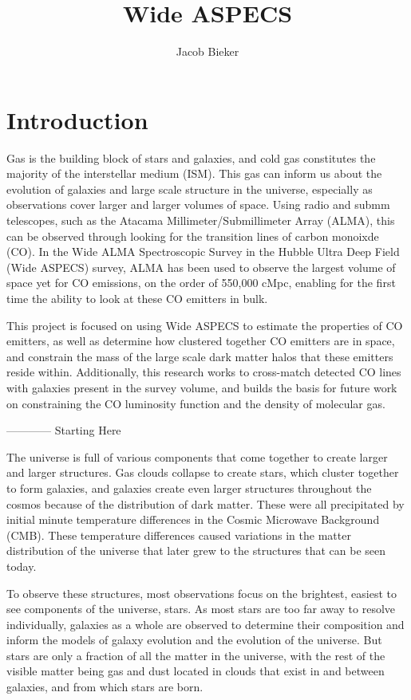 \documentclass[twoside,single]{lion-msc}
\title{Wide ASPECS}
\author{Jacob Bieker}
\affiliation{Leiden Observatory, Leiden University}
\begin{document}
\maketitle

\tableofcontents
\cleardoublepage

\chapter{Introduction}

Gas is the building block of stars and galaxies, and cold gas constitutes the majority of the interstellar medium (ISM). This gas can inform us about the evolution of galaxies and large scale structure in the universe, especially as observations cover larger and larger volumes of space. Using radio and submm telescopes, such as the Atacama Millimeter/Submillimeter Array (ALMA), this can be observed through looking for the transition lines of carbon monoixde (CO). In the Wide ALMA Spectroscopic Survey in the Hubble Ultra Deep Field (Wide ASPECS) survey, ALMA has been used to observe the largest volume of space yet for CO emissions, on the order of 550,000 cMpc, enabling for the first time the ability to look at these CO emitters in bulk. 

This project is focused on using Wide ASPECS to estimate the properties of CO emitters, as well as determine how clustered together CO emitters are in space, and constrain the mass of the large scale dark matter halos that these emitters reside within. Additionally, this research works to cross-match detected CO lines with galaxies present in the survey volume, and builds the basis for future work on constraining the CO luminosity function and the density of molecular gas.

------------ Starting Here

The universe is full of various components that come together to create larger and larger structures. Gas clouds collapse to create stars, which cluster together to form galaxies, and galaxies create even larger structures throughout the cosmos because of the distribution of dark matter. These were all precipitated by initial minute temperature differences in the Cosmic Microwave Background (CMB). These temperature differences caused variations in the matter distribution of the universe that later grew to the structures that can be seen today. 

To observe these structures, most observations focus on the brightest, easiest to see components of the universe, stars.  As most stars are too far away to resolve individually, galaxies as a whole are observed to determine their composition and inform the models of galaxy evolution and the evolution of the universe. But stars are only a fraction of all the matter in the universe, with the rest of the visible matter being gas and dust located in clouds that exist in and between galaxies, and from which stars are born. 
\end{document}
